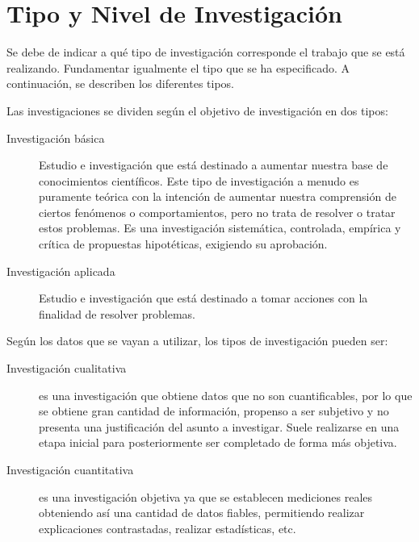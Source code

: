\documentclass[12]{plan_tesis}
\begin{document}
\section{Tipo y Nivel de Investigación}
Se debe de indicar a qué tipo de investigación corresponde el trabajo que se está realizando. Fundamentar igualmente el tipo que se ha especificado. A continuación, se describen los diferentes tipos.\newline 

Las investigaciones se dividen según el objetivo de investigación en dos tipos:\newline

\begin{description}

    \item[Investigación básica] Estudio e investigación que está destinado a aumentar nuestra base de conocimientos científicos. Este tipo de investigación a menudo es puramente teórica con la intención de aumentar nuestra comprensión de ciertos fenómenos o comportamientos, pero no trata de resolver o tratar estos problemas. Es una investigación sistemática, controlada, empírica y crítica de propuestas hipotéticas, exigiendo su aprobación.
    
    \item[Investigación aplicada] Estudio e investigación que está destinado a tomar acciones  con la finalidad de resolver problemas.
    
\end{description}

Según los datos que se vayan a utilizar, los tipos de investigación pueden ser:

\begin{description}

    \item[Investigación cualitativa] es una investigación que obtiene datos que no son cuantificables, por lo que se obtiene gran cantidad de información, propenso a ser subjetivo y no presenta una justificación del asunto a investigar. Suele realizarse en una etapa inicial para posteriormente ser completado de forma más objetiva.
    
    \item[Investigación cuantitativa] es una investigación objetiva ya que se establecen mediciones reales obteniendo así una cantidad de datos fiables, permitiendo realizar explicaciones contrastadas, realizar estadísticas, etc.

\end{description}
\end{document}
